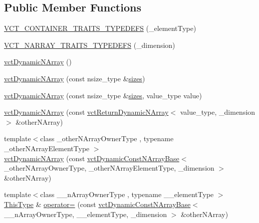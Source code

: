 \subsection*{Public Member Functions}
\begin{DoxyCompactItemize}
\item 
\hyperlink{classvct_dynamic_n_array_a4af562b1f07469aee8e1814229c25f43}{V\+C\+T\+\_\+\+C\+O\+N\+T\+A\+I\+N\+E\+R\+\_\+\+T\+R\+A\+I\+T\+S\+\_\+\+T\+Y\+P\+E\+D\+E\+F\+S} (\+\_\+element\+Type)
\item 
\hyperlink{classvct_dynamic_n_array_a8b81b0f17ae6ab1003db3caec7975a69}{V\+C\+T\+\_\+\+N\+A\+R\+R\+A\+Y\+\_\+\+T\+R\+A\+I\+T\+S\+\_\+\+T\+Y\+P\+E\+D\+E\+F\+S} (\+\_\+dimension)
\item 
\hyperlink{classvct_dynamic_n_array_a060ec7a5353aa03ec193408550e4db87}{vct\+Dynamic\+N\+Array} ()
\item 
\hyperlink{classvct_dynamic_n_array_aafd77c7531ef00396fdfb20405fc4661}{vct\+Dynamic\+N\+Array} (const nsize\+\_\+type \&\hyperlink{classvct_dynamic_const_n_array_base_aa86793343d80325ba5671bc24a2e0e8f}{sizes})
\item 
\hyperlink{classvct_dynamic_n_array_a3434a9ecc21191540f8a7e97c3bb1583}{vct\+Dynamic\+N\+Array} (const nsize\+\_\+type \&\hyperlink{classvct_dynamic_const_n_array_base_aa86793343d80325ba5671bc24a2e0e8f}{sizes}, value\+\_\+type value)
\item 
\hyperlink{classvct_dynamic_n_array_ad75002957a8c3602e333ba455f4676a5}{vct\+Dynamic\+N\+Array} (const \hyperlink{classvct_return_dynamic_n_array}{vct\+Return\+Dynamic\+N\+Array}$<$ value\+\_\+type, \+\_\+dimension $>$ \&other\+N\+Array)
\item 
{\footnotesize template$<$class \+\_\+other\+N\+Array\+Owner\+Type , typename \+\_\+other\+N\+Array\+Element\+Type $>$ }\\\hyperlink{classvct_dynamic_n_array_a87edcc1f96efe22934bdfa855aecebdb}{vct\+Dynamic\+N\+Array} (const \hyperlink{classvct_dynamic_const_n_array_base}{vct\+Dynamic\+Const\+N\+Array\+Base}$<$ \+\_\+other\+N\+Array\+Owner\+Type, \+\_\+other\+N\+Array\+Element\+Type, \+\_\+dimension $>$ \&other\+N\+Array)
\item 
{\footnotesize template$<$class \+\_\+\+\_\+n\+Array\+Owner\+Type , typename \+\_\+\+\_\+element\+Type $>$ }\\\hyperlink{classvct_dynamic_const_n_array_base_a5123caffcf1455a1b99003877eade897}{This\+Type} \& \hyperlink{classvct_dynamic_n_array_a6ae75d83b809f96fde255855bcc34919}{operator=} (const \hyperlink{classvct_dynamic_const_n_array_base}{vct\+Dynamic\+Const\+N\+Array\+Base}$<$ \+\_\+\+\_\+n\+Array\+Owner\+Type, \+\_\+\+\_\+element\+Type, \+\_\+dimension $>$ \&other\+N\+Array)

\end{DoxyCompactItemize}
